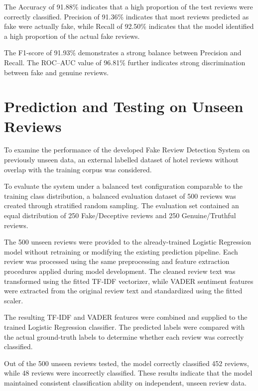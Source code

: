 \documentclass[12pt,a4paper]{report}
\begin{document}
The Accuracy of 91.88\% indicates that a high proportion of the test
reviews were correctly classified. Precision of 91.36\% indicates
that most reviews predicted as fake were actually fake, while Recall
of 92.50\% indicates that the model identified a high proportion of
the actual fake reviews.

The F1-score of 91.93\% demonstrates a strong balance between
Precision and Recall. The ROC--AUC value of 96.81\% further indicates
strong discrimination between fake and genuine reviews.


\section{Prediction and Testing on Unseen Reviews}

To examine the performance of the developed Fake Review
Detection System on previously unseen data, an external
labelled dataset of hotel reviews without overlap with
the training corpus was considered.

To evaluate the system under a balanced test configuration
comparable to the training class distribution, a balanced
evaluation dataset of 500 reviews was created through
stratified random sampling. The evaluation set contained
an equal distribution of 250 Fake/Deceptive reviews
and 250 Genuine/Truthful reviews.

The 500 unseen reviews were provided to the already-trained
Logistic Regression model without retraining or modifying
the existing prediction pipeline. Each review was processed
using the same preprocessing and feature extraction procedures
applied during model development. The cleaned review text
was transformed using the fitted TF-IDF vectorizer, while
VADER sentiment features were extracted from the original
review text and standardized using the fitted scaler.

The resulting TF-IDF and VADER features were combined
and supplied to the trained Logistic Regression
classifier. The predicted labels were compared with
the actual ground-truth labels to determine whether each
review was correctly classified.

Out of the 500 unseen reviews tested, the model correctly
classified 452 reviews, while 48 reviews were
incorrectly classified. These results indicate that
the model maintained consistent classification ability
on independent, unseen review data.
\end{document}
